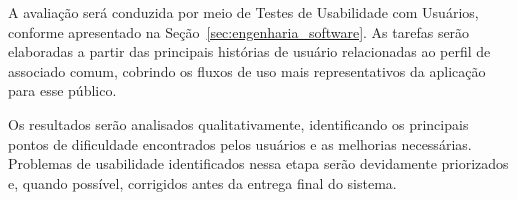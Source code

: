 A avaliação será conduzida por meio de Testes de Usabilidade com Usuários, conforme apresentado na Seção~\ref{sec:engenharia_software}. As tarefas serão elaboradas a partir das principais histórias de usuário relacionadas ao perfil de associado comum, cobrindo os fluxos de uso mais representativos da aplicação para esse público.

Os resultados serão analisados qualitativamente, identificando os principais pontos de dificuldade encontrados pelos usuários e as melhorias necessárias. Problemas de usabilidade identificados nessa etapa serão devidamente priorizados e, quando possível, corrigidos antes da entrega final do sistema.